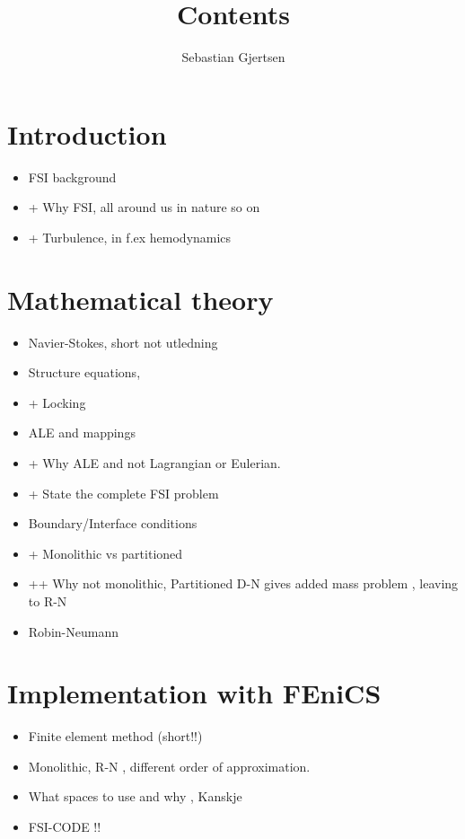 
\usepackage{listings}
\usepackage{amsmath}
\title{Contents}
\author{Sebastian Gjertsen}

\maketitle

\section*{Introduction}
\begin{itemize}
\item FSI background 
\item + Why FSI, all around us in nature so on
\item + Turbulence, in f.ex hemodynamics
\end{itemize}

\section*{Mathematical theory}
\begin{itemize}
\item Navier-Stokes, short not utledning
\item Structure equations, 
\item + Locking
\item ALE and mappings
\item + Why ALE and not Lagrangian or Eulerian. 
\item + State the complete FSI problem
\item Boundary/Interface conditions
\item + Monolithic vs partitioned 
\item ++ Why not monolithic, Partitioned D-N gives added mass problem , leaving to R-N
\item Robin-Neumann
\end{itemize}

\section*{Implementation with FEniCS}
\begin{itemize}
\item Finite element method (short!!)
\item Monolithic, R-N , different order of approximation. 
\item What spaces to use and why , Kanskje
\item FSI-CODE !!
\end{itemize}

